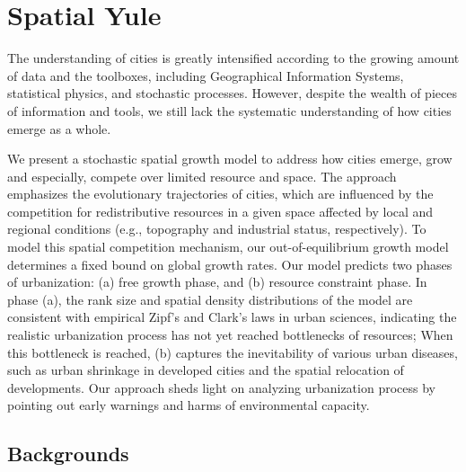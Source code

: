 \chapter{Spatial Yule}

The understanding of cities is greatly intensified according to the growing amount of data and the toolboxes, including Geographical Information Systems, statistical physics, and stochastic processes. However, despite the wealth of pieces of information and tools, we still lack the systematic understanding of how cities emerge as a whole. 

We present a stochastic spatial growth model to address how cities emerge, grow and especially, compete over limited resource and space. The approach emphasizes the evolutionary trajectories of cities, which are influenced by the competition for redistributive resources in a given space affected by local and regional conditions (e.g., topography and industrial status, respectively). To model this spatial competition mechanism, our out-of-equilibrium growth model determines a fixed bound on global growth rates. Our model predicts two phases of urbanization: (a) free growth phase, and (b) resource constraint phase. In phase (a), the rank size and spatial density distributions of the model are consistent with empirical Zipf's and Clark's laws in urban sciences, indicating the realistic urbanization process has not yet reached bottlenecks of resources; When this bottleneck is reached, (b) captures the inevitability of various urban diseases, such as urban shrinkage in developed cities and the spatial relocation of developments. Our approach sheds light on analyzing urbanization process by pointing out early warnings and harms of environmental capacity.


\section{Backgrounds} 

